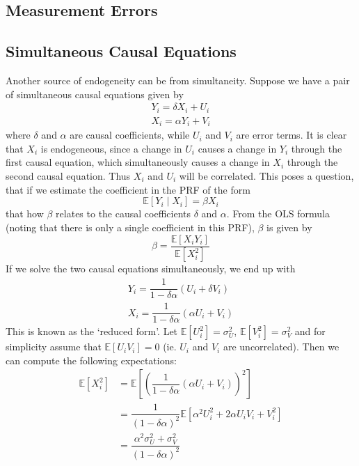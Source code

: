 \documentclass[11pt]{report} %
\begin{document}
\subsection{Measurement Errors}

\subsection{Simultaneous Causal Equations}

Another source of endogeneity can be from simultaneity. Suppose we have a pair of simultaneous causal equations given by
\begin{gather}
Y_{i} = \delta X_{i} + U_{i} \\
X_{i} = \alpha Y_{i} + V_{i}
\end{gather}
where $\delta$ and $\alpha$ are causal coefficients, while $U_{i}$ and $V_{i}$ are error terms. It is clear that $X_{i}$ is endogeneous, since a change in $U_{i}$ causes a change in $Y_{i}$ through the first causal equation, which simultaneously causes a change in $X_{i}$ through the second causal equation. Thus $X_{i}$ and $U_{i}$ will be correlated. This poses a question, that if we estimate the coefficient in the PRF of the form
\begin{equation}
\mathbb{E}\left[Y_{i}\middle| X_{i}\right] = \beta X_{i}
\end{equation}
that how $\beta$ relates to the causal coefficients $\delta$ and $\alpha$. From the OLS formula (noting that there is only a single coefficient in this PRF), $\beta$ is given by
\begin{equation}
\beta = \dfrac{\mathbb{E}\left[X_{i}Y_{i}\right]}{\mathbb{E}\left[X_{i}^{2}\right]}
\end{equation}
If we solve the two causal equations simultaneously, we end up with
\begin{gather}
Y_{i} = \dfrac{1}{1 - \delta\alpha}\left(U_{i} + \delta V_{i}\right) \\
X_{i} = \dfrac{1}{1 - \delta\alpha}\left(\alpha U_{i} + V_{i}\right)
\end{gather}
This is known as the `reduced form'. Let $\mathbb{E}\left[U_{i}^{2}\right] = \sigma_{U}^{2}$, $\mathbb{E}\left[V_{i}^{2}\right] = \sigma_{V}^{2}$ and for simplicity assume that $\mathbb{E}\left[U_{i}V_{i}\right] = 0$ (ie. $U_{i}$ and $V_{i}$ are uncorrelated). Then we can compute the following expectations:
\begin{align}
\mathbb{E}\left[X_{i}^{2}\right] &= \mathbb{E}\left[\left(\dfrac{1}{1 - \delta\alpha}\left(\alpha U_{i} + V_{i}\right)\right)^{2}\right] \\
&= \dfrac{1}{\left(1 - \delta\alpha\right)^{2}}\mathbb{E}\left[\alpha^{2}U_{i}^{2} + 2\alpha U_{i}V_{i} + V_{i}^{2}\right] \\
&= \dfrac{\alpha^{2}\sigma_{U}^{2} + \sigma_{V}^{2}}{\left(1 - \delta\alpha\right)^{2}}
\end{align}
\end{document}
